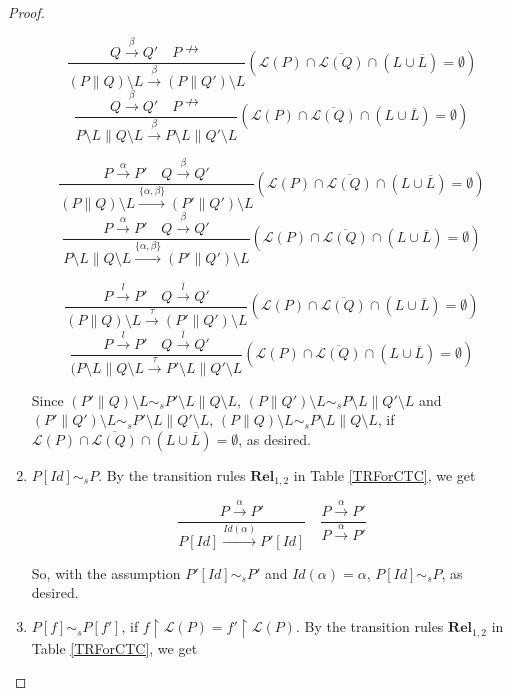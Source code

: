 \begin{proof}
\begin{enumerate}
      $$\frac{Q\xrightarrow{\beta}Q'\quad P\nrightarrow}{(P\parallel Q)\setminus L\xrightarrow{\beta}(P\parallel Q')\setminus L}(\mathcal{L}(P)\cap\overline{\mathcal{L}(Q)}\cap(L\cup\overline{L})=\emptyset)$$
      $$\frac{Q\xrightarrow{\beta}Q'\quad P\nrightarrow}{P\setminus L\parallel Q\setminus L\xrightarrow{\beta}P\setminus L\parallel Q'\setminus L}(\mathcal{L}(P)\cap\overline{\mathcal{L}(Q)}\cap(L\cup\overline{L})=\emptyset)$$

      $$\frac{P\xrightarrow{\alpha}P'\quad Q\xrightarrow{\beta}Q'}{(P\parallel Q)\setminus L\xrightarrow{\{\alpha,\beta\}}(P'\parallel Q')\setminus L}(\mathcal{L}(P)\cap\overline{\mathcal{L}(Q)}\cap(L\cup\overline{L})=\emptyset)$$
      $$\frac{P\xrightarrow{\alpha}P'\quad Q\xrightarrow{\beta}Q'}{P\setminus L\parallel Q\setminus L\xrightarrow{\{\alpha,\beta\}}(P'\parallel Q')\setminus L}(\mathcal{L}(P)\cap\overline{\mathcal{L}(Q)}\cap(L\cup\overline{L})=\emptyset)$$

      $$\frac{P\xrightarrow{l}P'\quad Q\xrightarrow{\overline{l}}Q'}{(P\parallel Q)\setminus L\xrightarrow{\tau}(P'\parallel Q')\setminus L}(\mathcal{L}(P)\cap\overline{\mathcal{L}(Q)}\cap(L\cup\overline{L})=\emptyset)$$
      $$\frac{P\xrightarrow{l}P'\quad Q\xrightarrow{\overline{l}}Q'}{(P\setminus L\parallel Q\setminus L\xrightarrow{\tau}P'\setminus L\parallel Q'\setminus L}(\mathcal{L}(P)\cap\overline{\mathcal{L}(Q)}\cap(L\cup\overline{L})=\emptyset)$$

      Since $(P'\parallel Q)\setminus L\sim_s P'\setminus L\parallel Q\setminus L$, $(P\parallel Q')\setminus L\sim_s P\setminus L\parallel Q'\setminus L$ and $(P'\parallel Q')\setminus L\sim_s P'\setminus L\parallel Q'\setminus L$, $(P\parallel Q)\setminus L\sim_s P\setminus L\parallel Q\setminus L$, if $\mathcal{L}(P)\cap\overline{\mathcal{L}(Q)}\cap(L\cup\overline{L})=\emptyset$, as desired.
  \item $P[Id]\sim_s P$. By the transition rules $\textbf{Rel}_{1,2}$ in Table \ref{TRForCTC}, we get

      $$\frac{P\xrightarrow{\alpha}P'}{P[Id]\xrightarrow{Id(\alpha)}P'[Id]}\quad \frac{P\xrightarrow{\alpha}P'}{P\xrightarrow{\alpha}P'}$$

      So, with the assumption $P'[Id]\sim_s P'$ and $Id(\alpha)=\alpha$, $P[Id]\sim_s P$, as desired.
  \item $P[f]\sim_s P[f']$, if $f\upharpoonright\mathcal{L}(P)=f'\upharpoonright\mathcal{L}(P)$. By the transition rules $\textbf{Rel}_{1,2}$ in Table \ref{TRForCTC}, we get


\end{enumerate}
\end{proof}
